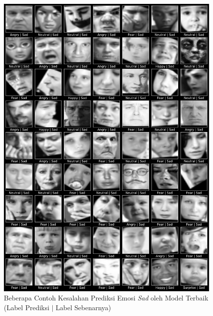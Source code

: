 \begin{figure}[t]
    \centering
    \includegraphics[width=14cm]{gambar/contoh_hasil_prediksi_false_sad.png}
    \caption{Beberapa Contoh Kesalahan Prediksi Emosi \textit{Sad} oleh Model Terbaik (Label Prediksi $|$ Label Sebenarnya)}
    \label{fig:hasilprediksifalse4}
\end{figure}


